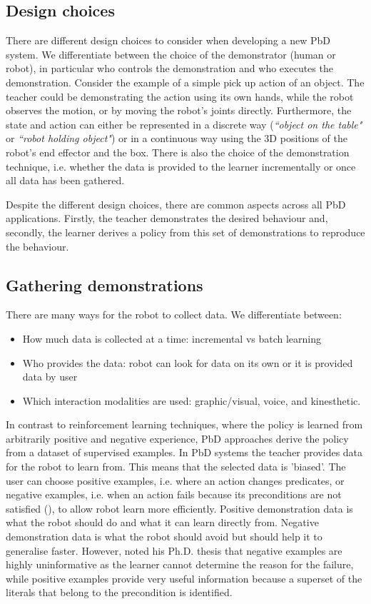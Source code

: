 \subsection{Design choices}
There are different design choices to consider when developing a new PbD system.
We differentiate between the choice of the demonstrator (human or robot), in particular who controls the demonstration and who executes the demonstration.
 Consider the example of a simple pick up action of an object.
 The teacher could be demonstrating the action using its own hands, while the robot observes the motion, or by moving the robot's joints directly.
 Furthermore, the state and action can either be represented in a discrete way (\textit{``object on the table"} or \textit{``robot holding object"}) or in a continuous way using the 3D positions of the robot's end effector and the box.
 There is also the choice of the demonstration technique, i.e. whether the data is provided to the learner incrementally or once all data has been gathered.
 
Despite the different design choices, there are common aspects across all PbD applications. Firstly, the teacher demonstrates the desired behaviour and, secondly, the learner derives a policy from this set of demonstrations to reproduce the behaviour.

\subsection{Gathering demonstrations} \label{subsec:Gathering demonstrations}
There are many ways for the robot to collect data.
 We differentiate between:
\begin{itemize}
    \item How much data is collected at a time: incremental vs batch learning
    \item Who provides the data: robot can look for data on its own or it is provided data by user
    \item Which interaction modalities are used: graphic/visual, voice, and kinesthetic. 
\end{itemize}

In contrast to reinforcement learning techniques, where the policy is learned from arbitrarily positive and negative experience, PbD approaches derive the policy from a dataset of supervised examples.
In PbD systems the teacher provides data for the robot to learn from.
This means that the selected data is 'biased'. 
The user can choose positive examples, i.e. where an action changes predicates, or negative examples, i.e. when an action fails because its preconditions are not satisfied (\cite{grollman2012robot}), to allow robot learn more efficiently.
Positive demonstration data is what the robot should do and what it can learn directly from.
Negative demonstration data is what the robot should avoid but should help it to generalise faster.
However, \cite{walsh2010efficient} noted his Ph.D. thesis that negative examples are highly uninformative as the learner cannot determine the reason for the failure, while positive examples provide very useful information because a superset of the literals that belong to the precondition is identified.

